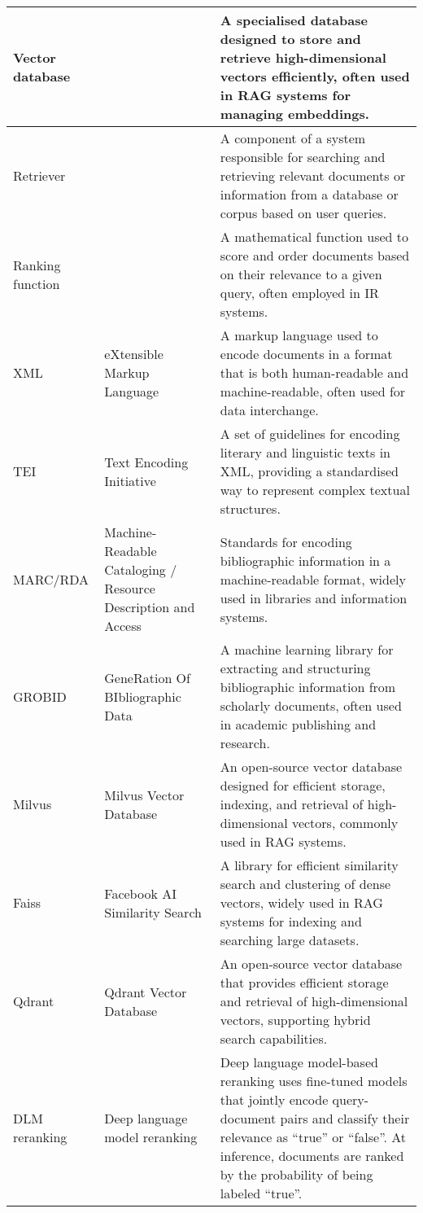 \begin{tabularx}{\textwidth}{
  >{\raggedright\arraybackslash}p{2.5cm}
  >{\raggedright\arraybackslash}p{4cm}
  >{\noindent\justifying\arraybackslash}X
}
\cmidrule(lr){1-3}
Vector database &    & A specialised database designed to store and retrieve high-dimensional vectors efficiently, often used in RAG systems for managing embeddings. \\
\cmidrule(lr){1-3}
Retriever &    & A component of a system responsible for searching and retrieving relevant documents or information from a database or corpus based on user queries. \\
\cmidrule(lr){1-3}
Ranking function &    & A mathematical function used to score and order documents based on their relevance to a given query, often employed in IR systems. \\
\cmidrule(lr){1-3}
XML & eXtensible Markup Language & A markup language used to encode documents in a format that is both human-readable and machine-readable, often used for data interchange. \\
\cmidrule(lr){1-3}
TEI & Text Encoding Initiative & A set of guidelines for encoding literary and linguistic texts in XML, providing a standardised way to represent complex textual structures. \\
\cmidrule(lr){1-3} 
MARC/RDA & Machine-Readable Cataloging / Resource Description and Access & Standards for encoding bibliographic information in a machine-readable format, widely used in libraries and information systems. \\
\cmidrule(lr){1-3}
GROBID & GeneRation Of BIbliographic Data & A machine learning library for extracting and structuring bibliographic information from scholarly documents, often used in academic publishing and research. \\
\cmidrule(lr){1-3}
Milvus & Milvus Vector Database & An open-source vector database designed for efficient storage, indexing, and retrieval of high-dimensional vectors, commonly used in RAG systems. \\
\cmidrule(lr){1-3}
Faiss  & Facebook AI Similarity Search & A library for efficient similarity search and clustering of
dense vectors, widely used in RAG systems for indexing and searching large datasets. \\
\cmidrule(lr){1-3}
Qdrant & Qdrant Vector Database & An open-source vector database that provides efficient storage and retrieval of high-dimensional vectors, supporting hybrid search capabilities. \\
\cmidrule(lr){1-3}
DLM reranking & Deep language model reranking & Deep language model-based reranking uses fine-tuned models that jointly encode query-document pairs and classify their relevance as ``true'' or ``false''. At inference, documents are ranked by the probability of being labeled ``true''. \\

\end{tabularx}
